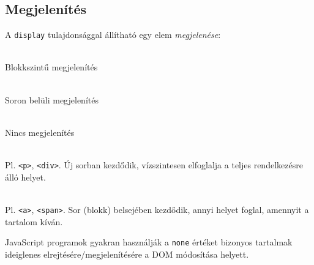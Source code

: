 \subsection{Megjelenítés}

\begin{frame}
  A \texttt{display} tulajdonsággal állítható egy elem \emph{megjelenése}:
  \begin{description}[m]
    \item[\texttt{block}] \hfill \\ Blokkszintű megjelenítés
    \item[\texttt{inline}] \hfill \\ Soron belüli megjelenítés
    \item[\texttt{none}] \hfill \\ Nincs megjelenítés
  \end{description}
\end{frame}

\begin{frame}
  \begin{description}[m]
    \item[Blokkszintű elemek] \hfill \\ Pl. \texttt{<p>}, \texttt{<div>}. Új sorban kezdődik, vízszintesen elfoglalja a teljes rendelkezésre álló helyet.
    \item[Soron belüli elemek] \hfill \\ Pl. \texttt{<a>}, \texttt{<span>}. Sor (blokk) belsejében kezdődik, annyi helyet foglal, amennyit a tartalom kíván.
  \end{description}
  \vfill
  JavaScript programok gyakran használják a \texttt{none} értéket bizonyos tartalmak ideiglenes elrejtésére/megjelenítésére a DOM módosítása helyett.
\end{frame}

